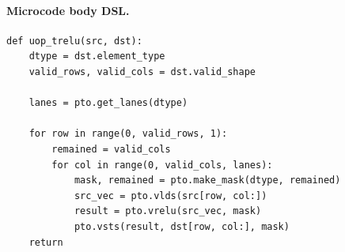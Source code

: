 \paragraph{Microcode body DSL.}
\begin{lstlisting}[style=ptocode]
def uop_trelu(src, dst):
    dtype = dst.element_type
    valid_rows, valid_cols = dst.valid_shape

    lanes = pto.get_lanes(dtype)

    for row in range(0, valid_rows, 1):
        remained = valid_cols
        for col in range(0, valid_cols, lanes):
            mask, remained = pto.make_mask(dtype, remained)
            src_vec = pto.vlds(src[row, col:])
            result = pto.vrelu(src_vec, mask)
            pto.vsts(result, dst[row, col:], mask)
    return
\end{lstlisting}
\Needspace{0.34\textheight}
